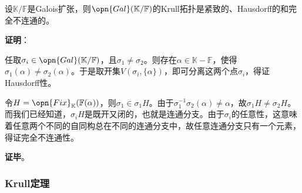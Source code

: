 \begin{theorem}{}
设$\mathbb{K}/\mathbb{F}$是Galois扩张，则$\opn{Gal}(\mathbb{K}/\mathbb{F})$的Krull拓扑是紧致的、Hausdorff的和完全不连通的。
\end{theorem}

\textbf{证明}：

任取$\sigma_i\in\opn{Gal}(\mathbb{K}/\mathbb{F})$，且$\sigma_1\neq \sigma_2$。则存在$\alpha\in\mathbb{K}-\mathbb{F}$，使得$\sigma_1(\alpha)\neq\sigma_2(\alpha)$。于是取开集$V(\sigma_i, \{\alpha\})$，即可分离这两个点$\sigma_i$，得证Hausdorff性。

令$H=\opn{Fix}_\mathbb{K}(\mathbb{F}(\alpha))$，则$\sigma_1\in\sigma_1H$。由于$\sigma_1^{-1}\sigma_2(\alpha)\neq \alpha$，故$\sigma_1H\neq\sigma_2H$。而我们已经知道，$\sigma_iH$是既开又闭的，也就是连通分支。由于$\sigma_i$的任意性，这意味着任意两个不同的自同构总在不同的连通分支中，故任意连通分支只有一个元素，得证完全不连通性。


\textbf{证毕}。





\subsubsection{Krull定理}

























